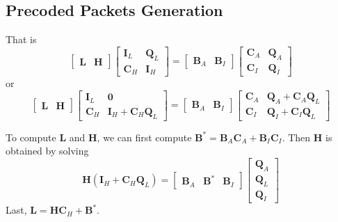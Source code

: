 \documentclass{report}
\newcommand{\ldpcnum}{L}
\newcommand{\hdpcnum}{H}
\newcommand{\lineann}[5][0.5]{%
    \begin{scope}[rotate=#3, blue,inner sep=2pt]
        \draw[dotted, blue!40] #2 -- +(0,#1)
            node [coordinate, near end] (a) {};
        \draw[dotted, blue!40] #2 ++(#4,0) -- +(0,#1)
            node [coordinate, near end] (b) {};
        \draw[|<->|] (a) -- node[fill=white] {#5} (b);
    \end{scope}
}
\begin{document}
    

\subsection{Precoded Packets Generation}

That is
\begin{equation*}
  \begin{bmatrix}
    \mathbf{L} & \mathbf{H}
  \end{bmatrix}
  \begin{bmatrix}
    \mathbf{I}_L & \mathbf{Q}_L \\
    \mathbf{C}_{H} & \mathbf{I}_H
  \end{bmatrix}
  = 
  \begin{bmatrix}
    \mathbf{B}_A & \mathbf{B}_I
  \end{bmatrix}
  \begin{bmatrix}
    \mathbf{C}_A & \mathbf{Q}_A \\
    \mathbf{C}_{I} & \mathbf{Q}_I
  \end{bmatrix}
\end{equation*}
or 
\begin{equation*}
  \begin{bmatrix}
    \mathbf{L} & \mathbf{H}
  \end{bmatrix}
  \begin{bmatrix}
    \mathbf{I}_L & \mathbf{0} \\
    \mathbf{C}_{H} & \mathbf{I}_H+\mathbf{C}_{H}\mathbf{Q}_L
  \end{bmatrix}
  = 
  \begin{bmatrix}
    \mathbf{B}_A & \mathbf{B}_I
  \end{bmatrix}
  \begin{bmatrix}
    \mathbf{C}_A & \mathbf{Q}_A + \mathbf{C}_A\mathbf{Q}_L\\
    \mathbf{C}_{I} & \mathbf{Q}_I + \mathbf{C}_{I}\mathbf{Q}_L
  \end{bmatrix}
\end{equation*}

To compute $\mathbf{L}$ and $\mathbf{H}$, we can first compute
$\mathbf{B}^* = \mathbf{B}_A \mathbf{C}_A + \mathbf{B}_I\mathbf{C}_{I}$. Then
$\mathbf{H}$ is obtained by solving
\begin{equation*}
  \mathbf{H}(\mathbf{I}_H+\mathbf{C}_{H}\mathbf{Q}_L) = 
  \begin{bmatrix}
    \mathbf{B}_A & \mathbf{B}^* & \mathbf{B}_I
  \end{bmatrix}
  \begin{bmatrix}
    \mathbf{Q}_A \\ \mathbf{Q}_L \\ \mathbf{Q}_I
  \end{bmatrix}
\end{equation*}
Last, $\mathbf{L} = \mathbf{H}\mathbf{C}_{H}+\mathbf{B}^*$.
\end{document}
